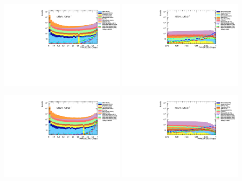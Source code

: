 \documentclass[UKenglish]{beamer}
\begin{document}
\begin{frame}
    \begin{center}
        \includegraphics[width = 0.475\textwidth]{figures/PNN/PNN50250Dist.pdf}
        \includegraphics[width = 0.475\textwidth]{figures/PNN/PNN50250Dist_C7.pdf}
    \end{center}
    \begin{center}
        \includegraphics[width = 0.475\textwidth]{figures/PNN/PNN200300Dist.pdf}
        \includegraphics[width = 0.475\textwidth]{figures/PNN/PNN200300Dist_C7.pdf}
    \end{center}
\end{frame}
\end{document}
